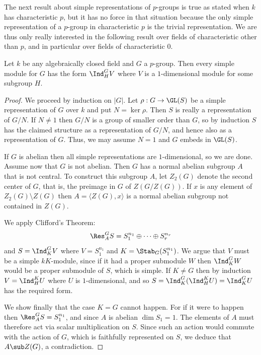 The next result about simple representations of $p$-groups is true as stated when $k$ has characteristic $p$, but it has no force in that situation because the only simple representation of a $p$-group in characteristic $p$ is the trivial representation. We are thus only really interested in the following result over fields of characteristic other than $p$, and in particular over fields of characteristic $0$.
\begin{corollary}
Let $k$ be any algebraically closed field and $G$ a $p$-group. Then every simple module for $G$ has the form $\Ind^G_HV$ where $V$ is a $1$-dimensional module for some subgroup $H$.
\end{corollary}
\begin{proof}
We proceed by induction on $|G|$. Let $\rho:G\to\GL(S)$ be a simple representation of $G$ over $k$ and put $N=\ker\rho$. Then $S$ is really a representation of $G/N$. If $N\neq 1$ then $G/N$ is a group of smaller order than $G$, so by induction $S$ has the claimed structure as a representation of $G/N$, and hence also as a representation of $G$. Thus, we may assume $N=1$ and $G$ embeds in $\GL(S)$.\par
If $G$ is abelian then all simple representations are $1$-dimensional, so we are done. Assume now that $G$ is not abelian. Then $G$ has a normal abelian subgroup $A$ that is not central. To construct this subgroup $A$, let $Z_2(G)$ denote the second center of $G$, that is, the preimage in $G$ of $Z(G/Z(G))$. If $x$ is any element of $Z_2(G)\setminus Z(G)$ then $A=\langle Z(G),x\rangle$ is a normal abelian subgroup not contained in $Z(G)$.\par
We apply Clifford's Theorem:
\[\Res^G_AS=S_1^{n_1}\oplus\cdots\oplus S_r^{n_r}\]
and $S=\Ind^G_KV$ where $V=S_1^{n_1}$ and $K=\Stab_G(S_1^{n_1})$. We argue that $V$ must be a simple $kK$-module, since if it had a proper submodule $W$ then $\Ind^G_KW$ would be a proper submodule of $S$, which is simple. If $K\neq G$ then by induction $V=\Ind^K_HU$ where $U$ is $1$-dimensional, and so $S=\Ind^G_K(\Ind^K_HU)=\Ind^G_KU$ has the required form.\par
We show finally that the case $K=G$ cannot happen. For if it were to happen
then $\Res^G_AS=S_1^{n_1}$, and since $A$ is abelian $\dim S_1=1$. The elements of $A$ must therefore act via scalar multiplication on $S$. Since such an action would commute with the action of $G$, which is faithfully represented on $S$, we deduce that $A\sub Z(G)$, a contradiction.
\end{proof}
